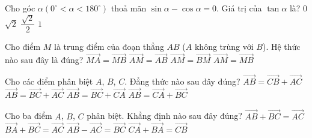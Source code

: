 \begin{ex}%
	Cho góc $\alpha\left(0^\circ<\alpha<180^\circ\right)$ thoả mãn $\sin \alpha-\cos \alpha=0$. Giá trị của  $\tan \alpha$ là?
	\choice
	{$0$}
	{$\sqrt{2}$}
	{$\dfrac{\sqrt{2}}{2}$}
	{\True $1$}

\end{ex}

\begin{ex}%
	Cho điểm $M$ là trung điểm của đoạn thẳng $AB$ ($A$ không trùng với $B$). Hệ thức nào sau đây là đúng?
	\choice
	{$\overrightarrow{MA}=\overrightarrow{MB}$}
	{$\overrightarrow{AM}=\overrightarrow{AB}$}
	{$\overrightarrow{AM}=\overrightarrow{BM}$}
	{\True $\overrightarrow{AM}=\overrightarrow{MB}$}
\end{ex}

\begin{ex}%
	Cho các điểm phân biệt $A$, $B$, $C$. Đẳng thức nào sau đây đúng?
	\choice
	{\True $\overrightarrow{AB}=\overrightarrow{CB}+\overrightarrow{AC}$}
	{$\overrightarrow{AB}=\overrightarrow{BC}+\overrightarrow{AC}$}
	{$\overrightarrow{AB}=\overrightarrow{BC}+\overrightarrow{CA}$}
	{$\overrightarrow{AB}=\overrightarrow{CA}+\overrightarrow{BC}$}
\end{ex}

\begin{ex}%
	Cho ba điểm $A$, $B$, $C$ phân biệt. Khẳng định nào sau đây đúng?
	\choice
	{\True $\overrightarrow{AB}+\overrightarrow{BC}=\overrightarrow{AC}$}
	{$\overrightarrow{BA}+\overrightarrow{BC}=\overrightarrow{AC}$}
	{$\overrightarrow{AB}-\overrightarrow{AC}=\overrightarrow{BC}$}
	{$\overrightarrow{CA}+\overrightarrow{BA}=\overrightarrow{CB}$}
\end{ex}

